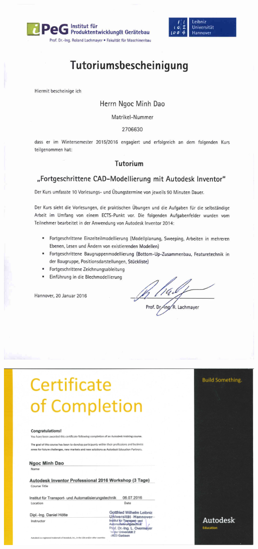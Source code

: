 \documentclass[12pt,a4paper]{scrartcl}
\begin{document}
\includegraphics [width=\linewidth, height=\textheight] {./zeugnisse/ipeg_autodesk_inventor_lq.jpg}


\includegraphics [angle=90 ,width=\linewidth, height=\textheight] {./zeugnisse/ita_inventor.jpg}
\end{document}
